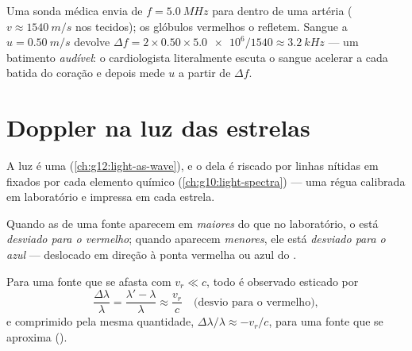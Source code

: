\begin{example}\label{ex:g12:doppler-effect:ultrasound}
Uma sonda médica envia  de $f = \qty{5.0}{MHz}$ para dentro de
uma artéria ($v \approx \qty{1540}{m/s}$ nos tecidos); os glóbulos
vermelhos o refletem. Sangue a $u = \qty{0.50}{m/s}$ devolve
$\Delta f = 2 \times 0.50 \times \num{5.0e6}/1540 \approx \qty{3.2}{kHz}$
--- um batimento \emph{audível}: o cardiologista literalmente escuta o
sangue acelerar a cada batida do coração e depois mede $u$ a partir de
$\Delta f$.
\end{example}

\section{Doppler na luz das estrelas}

A luz é uma  (\cref{ch:g12:light-as-wave}), e o  dela é
riscado por linhas nítidas em  fixados por cada
elemento químico (\cref{ch:g10:light-spectra}) --- uma régua calibrada em
laboratório e impressa em cada estrela.

\begin{definition}\label{def:g12:doppler-effect:redshift}
Quando as  de uma fonte aparecem em 
\emph{maiores} do que no laboratório, o  está \emph{desviado para
o vermelho}; quando aparecem
\emph{menores}, ele está \emph{desviado para o azul} --- deslocado em direção à ponta vermelha ou azul do .
\end{definition}

\begin{proposition}\label{prop:g12:doppler-effect:light}
Para uma fonte que se afasta com  $v_r \ll c$, todo
 é observado esticado por
\[ \frac{\Delta \lambda}{\lambda} = \frac{\lambda' - \lambda}{\lambda} \approx \frac{v_r}{c} \quad \text{(desvio para o vermelho)}, \]
e comprimido pela mesma quantidade, $\Delta\lambda/\lambda \approx -v_r/c$,
para uma fonte que se aproxima ().
\end{proposition}
\admitted


